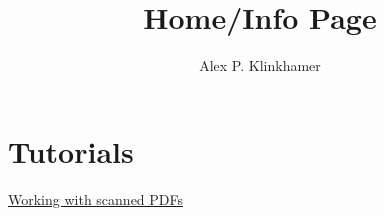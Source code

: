 
\title{Home/Info Page}
\author{Alex P. Klinkhamer}
\date{}



\section{Tutorials}
\href{tut/pdfscan.html}{Working with scanned PDFs}\\



